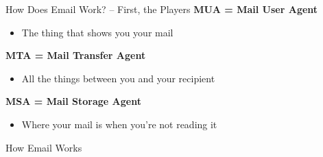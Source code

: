 \documentclass[nobackground,dvipsnames,table]{beamer}
\begin{document}
\begin{frame}{How Does Email Work? – First, the Players}
    \textbf{MUA = Mail User Agent}
    \begin{itemize}
        \item The thing that shows you your mail
    \end{itemize}
    
    \textbf{MTA = Mail Transfer Agent}
    \begin{itemize}
        \item All the things between you and your recipient
    \end{itemize}
    
    \textbf{MSA = Mail Storage Agent}
    \begin{itemize}
        \item Where your mail is when you're not reading it
    \end{itemize}
\end{frame}

\begin{frame}{How Email Works}
\end{frame}
\end{document}
